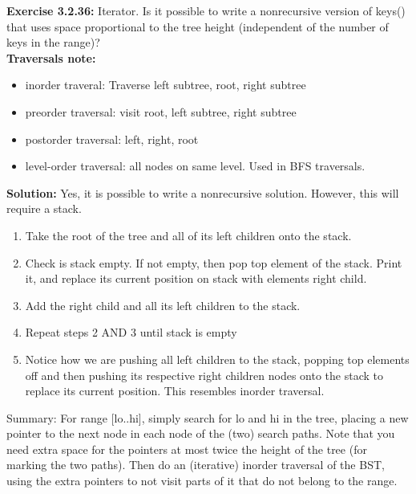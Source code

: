 \documentclass[11pt,fleqn]{article}
\newcommand{\be}{\begin{enumerate}}
\newcommand{\ee}{\end{enumerate}}
\begin{document}
\textbf{Exercise 3.2.36:} Iterator. Is it possible to write a nonrecursive version of keys() that uses space
proportional to the tree height (independent of the number of keys in the range)?\\

\textbf{Traversals note:}
\begin{itemize}
	\item inorder traveral: Traverse left subtree, root, right subtree
	\item preorder traversal: visit root, left subtree, right subtree
	
	\item postorder traversal: left, right, root
	
	\item level-order traversal: all nodes on same level. Used in BFS traversals.
\end{itemize}

\textbf{Solution:} Yes, it is possible to write a nonrecursive solution. However, this will require a stack.

\be
	\item Take the root of the tree and all of its left children onto the stack.
	
	\item Check is stack empty. If not empty, then pop top element of the stack. Print it, and replace its current position on stack with elements right child.
	
	\item Add the right child and all its left children to the stack.
	
	\item Repeat steps 2 AND 3 until stack is empty
	
	\item Notice how we are pushing all left children to the stack, popping top elements off and then pushing its respective right children nodes onto the stack to replace its current position. This resembles inorder traversal.
\ee

Summary: For range [lo..hi], simply search for lo and hi in the tree, placing a new pointer to
the next node in each node of the (two) search paths. Note that you need extra space for
the pointers at most twice the height of the tree (for marking the two paths). Then do
an (iterative) inorder traversal of the BST, using the extra pointers to not visit parts of
it that do not belong to the range.
\end{document}
